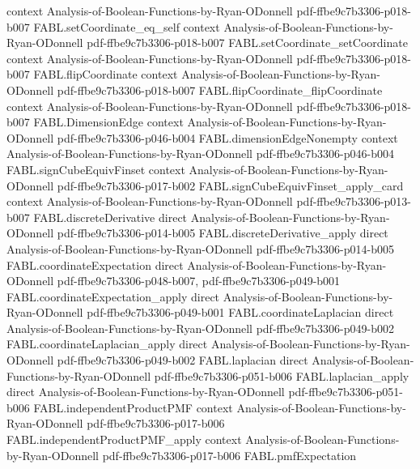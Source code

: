 \begin{theorem}
  {context}
  {Analysis-of-Boolean-Functions-by-Ryan-ODonnell}
  {pdf-ffbe9c7b3306-p018-b007}
\proofstep
  {FABL.setCoordinate_eq_self}
  {context}
  {Analysis-of-Boolean-Functions-by-Ryan-ODonnell}
  {pdf-ffbe9c7b3306-p018-b007}
\proofstep
  {FABL.setCoordinate_setCoordinate}
  {context}
  {Analysis-of-Boolean-Functions-by-Ryan-ODonnell}
  {pdf-ffbe9c7b3306-p018-b007}
\proofstep
  {FABL.flipCoordinate}
  {context}
  {Analysis-of-Boolean-Functions-by-Ryan-ODonnell}
  {pdf-ffbe9c7b3306-p018-b007}
\proofstep
  {FABL.flipCoordinate_flipCoordinate}
  {context}
  {Analysis-of-Boolean-Functions-by-Ryan-ODonnell}
  {pdf-ffbe9c7b3306-p018-b007}
\proofstep
  {FABL.DimensionEdge}
  {context}
  {Analysis-of-Boolean-Functions-by-Ryan-ODonnell}
  {pdf-ffbe9c7b3306-p046-b004}
\proofstep
  {FABL.dimensionEdgeNonempty}
  {context}
  {Analysis-of-Boolean-Functions-by-Ryan-ODonnell}
  {pdf-ffbe9c7b3306-p046-b004}
\proofstep
  {FABL.signCubeEquivFinset}
  {context}
  {Analysis-of-Boolean-Functions-by-Ryan-ODonnell}
  {pdf-ffbe9c7b3306-p017-b002}
\proofstep
  {FABL.signCubeEquivFinset_apply_card}
  {context}
  {Analysis-of-Boolean-Functions-by-Ryan-ODonnell}
  {pdf-ffbe9c7b3306-p013-b007}
\proofstep
  {FABL.discreteDerivative}
  {direct}
  {Analysis-of-Boolean-Functions-by-Ryan-ODonnell}
  {pdf-ffbe9c7b3306-p014-b005}
\proofstep
  {FABL.discreteDerivative_apply}
  {direct}
  {Analysis-of-Boolean-Functions-by-Ryan-ODonnell}
  {pdf-ffbe9c7b3306-p014-b005}
\proofstep
  {FABL.coordinateExpectation}
  {direct}
  {Analysis-of-Boolean-Functions-by-Ryan-ODonnell}
  {pdf-ffbe9c7b3306-p048-b007,
    pdf-ffbe9c7b3306-p049-b001}
\proofstep
  {FABL.coordinateExpectation_apply}
  {direct}
  {Analysis-of-Boolean-Functions-by-Ryan-ODonnell}
  {pdf-ffbe9c7b3306-p049-b001}
\proofstep
  {FABL.coordinateLaplacian}
  {direct}
  {Analysis-of-Boolean-Functions-by-Ryan-ODonnell}
  {pdf-ffbe9c7b3306-p049-b002}
\proofstep
  {FABL.coordinateLaplacian_apply}
  {direct}
  {Analysis-of-Boolean-Functions-by-Ryan-ODonnell}
  {pdf-ffbe9c7b3306-p049-b002}
\proofstep
  {FABL.laplacian}
  {direct}
  {Analysis-of-Boolean-Functions-by-Ryan-ODonnell}
  {pdf-ffbe9c7b3306-p051-b006}
\proofstep
  {FABL.laplacian_apply}
  {direct}
  {Analysis-of-Boolean-Functions-by-Ryan-ODonnell}
  {pdf-ffbe9c7b3306-p051-b006}
\proofstep
  {FABL.independentProductPMF}
  {context}
  {Analysis-of-Boolean-Functions-by-Ryan-ODonnell}
  {pdf-ffbe9c7b3306-p017-b006}
\proofstep
  {FABL.independentProductPMF_apply}
  {context}
  {Analysis-of-Boolean-Functions-by-Ryan-ODonnell}
  {pdf-ffbe9c7b3306-p017-b006}
\proofstep
  {FABL.pmfExpectation}

\end{theorem}
